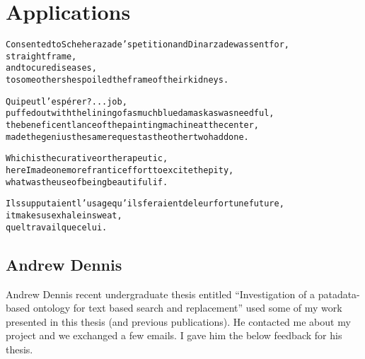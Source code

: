 
\chapter{Applications}
\label{ch:applications}

\startcontents[chapters]

\vfill

\begin{alltt}\sffamily
Consented to Scheherazade's petition and Dinarzade was sent for,
straight frame,
and to cure diseases,
to some others he spoiled the frame of their kidneys.

Qui peut l'espérer ?... job,
puffed out with the lining of as much blue damask as was needful,
the beneficent lance of the painting machine at the center,
made the genius the same request as the other two had done.

Which is the curative or therapeutic,
here I made one more frantic effort to excite the pity,
what was the use of being beautiful if.

Ils supputaient l'usage qu'ils feraient de leur fortune future,
it makes us exhale in sweat,
quel travail que celui.
\end{alltt}

\newpage
\minicontents
\spirals



\section{Andrew Dennis}


Andrew Dennis recent undergraduate thesis entitled ``Investigation of a patadata-based ontology for text based search and replacement'' \citeyear{Dennis2016} used some of my work presented in this thesis (and previous publications). He contacted me about my project and we exchanged a few emails. I gave him the below feedback for his thesis.

